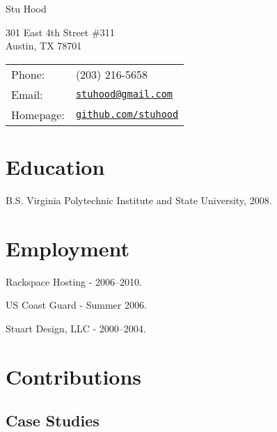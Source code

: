 \documentclass[letterpaper]{article}
\def\name{Stu Hood}
\renewenvironment{itemize}{
  \begin{list}{}{
    \setlength{\leftmargin}{1.5em}
  }
}{
  \end{list}
}
\begin{document}
{\huge \name}


\vspace{0.25in}

\begin{minipage}{0.45\linewidth}
  301 East 4th Street \#311 \\
  Austin, TX 78701
\end{minipage}
\begin{minipage}{0.45\linewidth}
  \begin{tabular}{ll}
    Phone: & (203) 216-5658 \\
    Email: & \href{mailto:stuhood@gmail.com}{\tt stuhood@gmail.com} \\
    Homepage: & \href{http://www.github.com/stuhood/}{\tt github.com/stuhood} \\
  \end{tabular}
\end{minipage}


\section*{Education}

\begin{itemize}
  \item B.S. Virginia Polytechnic Institute and State University, 2008.
\end{itemize}


\section*{Employment}

\begin{itemize}
  \item Rackspace Hosting - 2006--2010.
  \item US Coast Guard - Summer 2006.
  \item Stuart Design, LLC - 2000--2004.
\end{itemize}


\section*{Contributions}

\subsection*{Case Studies}
\end{document}
